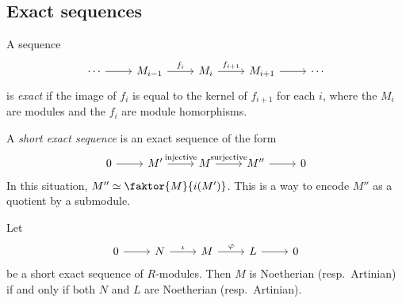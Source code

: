 \subsection{Exact sequences}
\begin{definition}
    A sequence
    \[\begin{tikzcd}
        \cdots & {M_{i-1}} & {M_i} & {M_{i+1}} & \cdots
        \arrow[from=1-1, to=1-2]
        \arrow["{f_i}", from=1-2, to=1-3]
        \arrow["{f_{i+1}}", from=1-3, to=1-4]
        \arrow[from=1-4, to=1-5]
    \end{tikzcd}\]
    is \emph{exact} if the image of \( f_i \) is equal to the kernel of \( f_{i+1} \) for each \( i \), where the \( M_i \) are modules and the \( f_i \) are module homorphisms.
\end{definition}
\begin{definition}
    A \emph{short exact sequence} is an exact sequence of the form
    \[\begin{tikzcd}
        0 & {M'} & M & {M''} & 0
        \arrow[from=1-1, to=1-2]
        \arrow["{\text{injective}}", from=1-2, to=1-3]
        \arrow["{\text{surjective}}", from=1-3, to=1-4]
        \arrow[from=1-4, to=1-5]
    \end{tikzcd}\]
    In this situation, \( M'' \simeq \faktor{M}{i(M')} \).
    This is a way to encode \( M'' \) as a quotient by a submodule.
\end{definition}
\begin{lemma}
    Let
    \[\begin{tikzcd}
        0 & N & M & L & 0
        \arrow[from=1-1, to=1-2]
        \arrow["\iota", from=1-2, to=1-3]
        \arrow["\varphi", from=1-3, to=1-4]
        \arrow[from=1-4, to=1-5]
    \end{tikzcd}\]
    be a short exact sequence of \( R \)-modules.
    Then \( M \) is Noetherian (resp.\ Artinian) if and only if both \( N \) and \( L \) are Noetherian (resp.\ Artinian).
\end{lemma}
